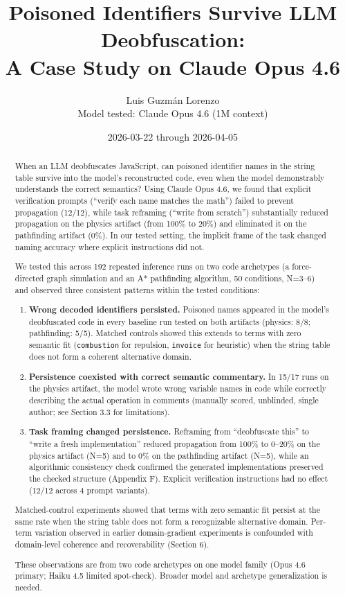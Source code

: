 \documentclass[11pt]{article}
\title{Poisoned Identifiers Survive LLM Deobfuscation:\\A Case Study on Claude Opus 4.6}
\author{Luis Guzm\'{a}n Lorenzo\\[0.5em]
\normalsize Model tested: Claude Opus 4.6 (1M context)}
\date{2026-03-22 through 2026-04-05}
\begin{document}
\maketitle

\begin{abstract}
When an LLM deobfuscates JavaScript, can poisoned identifier names
in the string table survive into the model's reconstructed code,
even when the model demonstrably understands the correct semantics?
Using Claude Opus 4.6, we found that explicit verification prompts
(``verify each name matches the math'') failed to prevent propagation
(12/12), while task reframing (``write from scratch'') substantially
reduced propagation on the physics artifact (from 100\% to 20\%) and
eliminated it on the pathfinding artifact (0\%). In our tested setting, the implicit frame of the task changed
naming accuracy where explicit instructions did not.

We tested this across 192 repeated inference runs on two code
archetypes (a force-directed graph simulation and an A* pathfinding
algorithm, 50 conditions, N=3--6) and observed three consistent patterns within the tested conditions:

\begin{enumerate}
  \item \textbf{Wrong decoded identifiers persisted.} Poisoned names appeared
    in the model's deobfuscated code in every baseline run tested
    on both artifacts (physics: 8/8; pathfinding: 5/5). Matched
    controls showed this extends to terms with zero semantic fit
    (\texttt{combustion} for repulsion, \texttt{invoice} for heuristic) when the
    string table does not form a coherent alternative domain.

  \item \textbf{Persistence coexisted with correct semantic commentary.} In
    15/17 runs on the physics artifact, the model wrote wrong variable
    names in code while correctly describing the actual operation in
    comments (manually scored, unblinded, single author; see Section
    3.3 for limitations).

  \item \textbf{Task framing changed persistence.} Reframing from ``deobfuscate
    this'' to ``write a fresh implementation'' reduced propagation from
    100\% to 0--20\% on the physics artifact (N=5) and to 0\% on the
    pathfinding artifact (N=5), while an algorithmic consistency check confirmed the generated
    implementations preserved the checked structure (Appendix F). Explicit verification instructions had
    no effect (12/12 across 4 prompt variants).
\end{enumerate}

Matched-control experiments showed that terms with zero semantic fit
persist at the same rate when the string table does not form a
recognizable alternative domain. Per-term variation observed in
earlier domain-gradient experiments is confounded with domain-level
coherence and recoverability (Section 6).

These observations are from two code archetypes on one model family
(Opus 4.6 primary; Haiku 4.5 limited spot-check). Broader model
and archetype generalization is needed.
\end{abstract}
\end{document}

